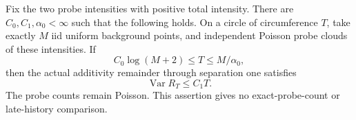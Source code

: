 \documentclass[11pt,letterpaper]{article}
\begin{document}
\begin{corollary}
\label{cor:original-count-remainder-variance}
Fix the two probe intensities with positive total intensity.
There are $C_0,C_1,\alpha_0<\infty$ such that the following holds.
On a circle of circumference $T$, take exactly $M$ iid uniform
background points, and independent Poisson probe clouds of
these intensities. If
\[
 C_0\log(M+2)\le T\le M/\alpha_0,
\]
then the actual additivity remainder through separation one
satisfies
\begin{equation}\label{eq:original-count-remainder-variance}
 \operatorname{Var}R_T\le C_1T.
\end{equation}
The probe counts remain Poisson. This assertion gives no
exact-probe-count or late-history comparison.
\end{corollary}
\end{document}
